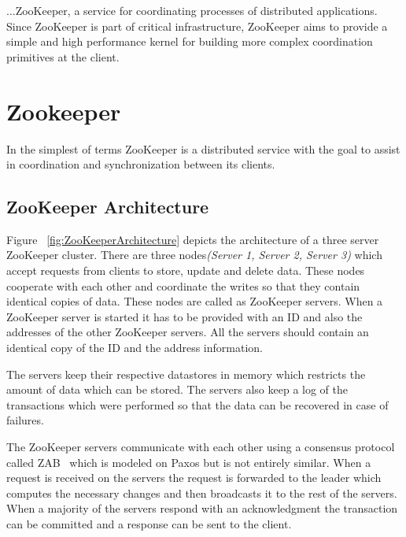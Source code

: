 \begin{savequote}[100mm]
...ZooKeeper, a service for coordinating processes of distributed applications. Since ZooKeeper is part of critical infrastructure, ZooKeeper aims to provide a simple and high performance kernel for building more complex coordination primitives at the client.
\end{savequote}

\chapter{Zookeeper}
In the simplest of terms ZooKeeper is a distributed service with the goal to assist in coordination and synchronization between its clients.

\section{ZooKeeper Architecture}

Figure ~\ref{fig:ZooKeeperArchitecture} depicts the architecture of a three server ZooKeeper cluster. There are three nodes\textit{(Server 1, Server 2, Server 3)} which accept requests from clients to store, update and delete data. These nodes cooperate with each other and coordinate the writes so that they contain identical copies of data. These nodes are called as ZooKeeper servers. When a ZooKeeper server is started it has to be provided with an ID and also the addresses of the other ZooKeeper servers. All the servers should contain an identical copy of the ID and the address information.

The servers keep their respective datastores in memory which restricts the amount of data which can be stored. The servers also keep a log of the transactions which were performed so that the data can be recovered in case of failures.

\addvspace{2.5em}

\addvspace{1.0em}

The ZooKeeper servers communicate with each other using a consensus protocol called ZAB~\cite{junqueira2011zab} which is modeled on Paxos but is not entirely similar. When a request is received on the servers the request is forwarded to the leader which computes the necessary changes and then broadcasts it to the rest of the servers. When a majority of the servers respond with an acknowledgment the transaction can be committed and a response can be sent to the client. 

